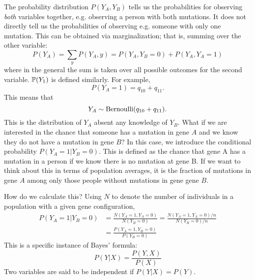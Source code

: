 


The probability distribution $P(Y_A,Y_B)$ tells us the probabilities for observing \emph{both} variables together, e.g. observing a person with both mutations. It does not directly tell us the probabilities of observing e.g. someone with only one mutation. This can be obtained via marginalization; that is, summing over the other variable:
\begin{equation}
P(Y_A)  = \sum_{y}P(Y_A,y) = P(Y_A,Y_B = 0)  +P(Y_A,Y_A = 1)
\end{equation}
where in the general the sum is taken over all possible outcomes for the second variable. $\mathbb P(Y_1)$ is defined similarly. 
For example, 
\begin{equation}
P(Y_A = 1) = q_{10} + q_{11}.
\end{equation}
This means that 
\begin{equation}
Y_A \sim {\rm Bernoulli}(q_{10}+q_{11}).
\end{equation}
This is the distribution of $Y_A$ absent any knowledge of $Y_B$. What if we are interested in the chance that someone has a mutation in gene $A$ and we know they do not have a mutation in gene $B$?  In this case, we introduce the {\dfn conditional probability} $P(Y_A=1|Y_B=0)$. This is defined as the chance that gene A has a mutation in a person if we know there is no mutation at gene B. If we want to think about this in terms of population averages, it is the fraction of mutations in gene $A$ among only those people without mutations in gene gene $B$. 


How do we calculate this? Using $N$ to denote the number of individuals in a population with a given gene configuration,  
\begin{align}
P(Y_A=1|Y_B=0) &= \frac{N(Y_A = 1,Y_A = 0)}{N(Y_B=0)} = \frac{N(Y_A = 1,Y_A = 0)/n}{N(Y_B=0)/n} \\
&= \frac{P(Y_A = 1,Y_B = 0)}{P(Y_B = 0)}
\end{align}
This is a specific instance of Bayes' formula: 
\begin{equation}\label{eq:bayes}
P(Y|X) = \frac{P(Y,X)}{P(X)}
\end{equation}
Two variables are said to be {\dfn independent} if $P(Y|X)  = P(Y)$.  


